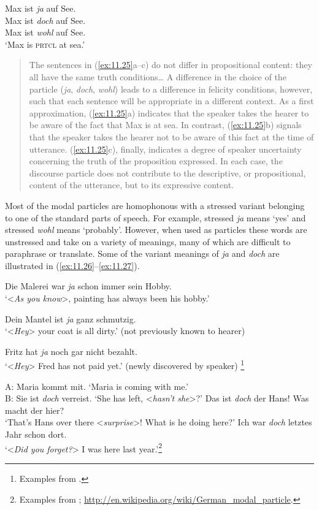 \ea \label{ex:11.25}
\ea  Max ist \textit{ja} auf See.\\
\ex Max ist \textit{doch} auf See.\\
\ex Max ist \textit{wohl} auf See.\\
‘Max is \textsc{prtcl} at sea.’
\z

\begin{quote}
The sentences in (\ref{ex:11.25}a–c) do not differ in propositional content: they all have the same truth conditions…  A difference in the choice of the particle (\textit{ja}, \textit{doch}, \textit{wohl}) leads to a difference in felicity conditions, however, such that each sentence will be appropriate in a different context. As a first approximation, (\ref{ex:11.25}a) indicates that the speaker takes the hearer to be aware of the fact that Max is at sea. In contrast, (\ref{ex:11.25}b) signals that the speaker takes the hearer not to be aware of this fact at the time of utterance. (\ref{ex:11.25}c), finally, indicates a degree of speaker uncertainty concerning the truth of the proposition expressed. In each case, the discourse particle does not contribute to the descriptive, or propositional, content of the utterance, but to its expressive content.
\end{quote}
\z


Most of the  modal particles are homophonous with a stressed variant belonging to one of the standard parts of speech. For example, stressed \textit{ja} means ‘yes’ and stressed \textit{wohl} means ‘probably’. However, when used as particles these words are unstressed and take on a variety of meanings, many of which are difficult to paraphrase or translate. Some of the variant meanings of \textit{ja} and \textit{doch} are illustrated in (\ref{ex:11.26}--\ref{ex:11.27}).


\ea \label{ex:11.26}
\ea  Die Malerei war \textit{ja} schon immer sein Hobby.\\
\glt ‘<\textit{As you know}>, painting has always been his hobby.’

\ex  Dein Mantel ist \textit{ja} ganz schmutzig.\\
\glt ‘<\textit{Hey}> your coat is all dirty.’ (not previously known to hearer)

\ex Fritz hat \textit{ja} noch gar nicht bezahlt.\\
\glt ‘<\textit{Hey}> Fred has not paid yet.’ (newly discovered by speaker)
\footnote{Examples from \citealt{König1991,KönigEtAl1990,Waltereit2001}.}
\z \z

\ea \label{ex:11.27} \ea  A: Maria kommt mit. ‘Maria is coming with me.’\\
    B: Sie ist \textit{doch} verreist. ‘She has left, <\textit{hasn’t she}>?’
\ex  Das ist \textit{doch} der Hans! Was macht der hier?\\
‘That’s Hans over there <\textit{surprise}>! What is he doing here?’
\ex Ich war \textit{doch} letztes Jahr schon dort.\\
‘<\textit{Did you forget?}> I was here last year.’\footnote{Examples from \citet{Karagjosova2000,Grosz2010}; \url{http://en.wikipedia.org/wiki/German_modal_particle}.}
\z \z 


